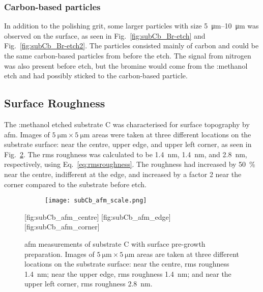 \subsubsection{Carbon-based particles}
In addition to the polishing grit, some larger particles with size \SIrange{5}{10}{\micro\metre} was observed on the surface, as seen in Fig.~\ref{fig:subCb_Br-etch} and Fig.~\ref{fig:subCb_Br-etch2}. The particles consisted mainly of carbon and could be the same carbon-based particles from before the etch. The signal from nitrogen was also present before etch, but the bromine would come from the :methanol etch and had possibly sticked to the carbon-based particle.


\subsection{Surface Roughness}

The :methanol etched substrate C was characterised for surface topography by \ac{afm}. Images of $\SI{5}{\micro\metre}\times\SI{5}{\micro\metre}$ areas were taken at three different locations on the substrate surface: near the centre, upper edge, and upper left corner, as seen in Fig.~\ref{fig:subCb_afm}. The \ac{rms} roughness was calculated to be \SI{1.4}{\nano\metre}, \SI{1.4}{\nano\metre}, and \SI{2.8}{\nano\metre}, respectively, using Eq.~\ref{eq:rmsroughness}. The roughness had increased by \SI{50}{\percent} near the centre, indifferent at the edge, and increased by a factor 2 near the corner compared to the substrate before etch.

\begin{figure}[htbp]
    \centering
    \begin{subfigure}[c]{0.032\linewidth}
        \label{fig:subCb_afm_scale}\captionsetup{list=no}
        \texttt{[image: subCb\_afm\_scale.png]}
    \end{subfigure}
    \hfill
    [fig:subCb_afm_centre]  %
    \hfill
    [fig:subCb_afm_edge]  %
    \hfill
    [fig:subCb_afm_corner]  %
    \caption[\Ac{afm} of substrate C with surface pre-growth preparation.]{\Ac{afm} measurements of substrate C with surface pre-growth preparation. Images of $\SI{5}{\micro\metre}\times\SI{5}{\micro\metre}$ areas are taken at three different locations on the substrate surface:  near the centre, \ac{rms} roughness \SI{1.4}{\nano\metre};  near the upper edge, \ac{rms} roughness \SI{1.4}{\nano\metre}; and  near the upper left corner, \ac{rms} roughness \SI{2.8}{\nano\metre}.}
    \label{fig:subCb_afm}
\end{figure} %

